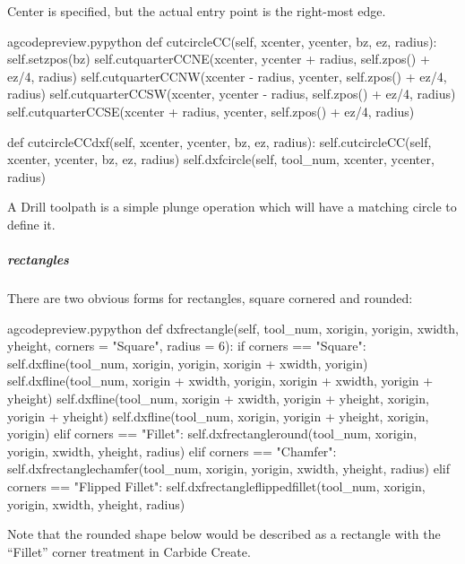 \documentclass{ltxdoc}
\begin{document}
Center is specified, but the actual entry point is the right-most edge.

\lstset{firstnumber=\thegcpy}
\begin{writecode}{a}{gcodepreview.py}{python}
    def cutcircleCC(self, xcenter, ycenter, bz, ez, radius):
        self.setzpos(bz)
        self.cutquarterCCNE(xcenter, ycenter + radius, self.zpos() + ez/4, radius) 
        self.cutquarterCCNW(xcenter - radius, ycenter, self.zpos() + ez/4, radius) 
        self.cutquarterCCSW(xcenter, ycenter - radius, self.zpos() + ez/4, radius) 
        self.cutquarterCCSE(xcenter + radius, ycenter, self.zpos() + ez/4, radius) 

    def cutcircleCCdxf(self, xcenter, ycenter, bz, ez, radius):
        self.cutcircleCC(self, xcenter, ycenter, bz, ez, radius)
        self.dxfcircle(self, tool_num, xcenter, ycenter, radius)

\end{writecode}
\addtocounter{gcpy}{49}



A Drill toolpath is a simple plunge operation which will have a matching circle to define it.

\subparagraph{rectangles}

There are two obvious forms for rectangles, square cornered and rounded:

\lstset{firstnumber=\thegcpy}
\begin{writecode}{a}{gcodepreview.py}{python}
    def dxfrectangle(self, tool_num, xorigin, yorigin, xwidth, yheight, corners = "Square", radius = 6):
        if corners == "Square":
            self.dxfline(tool_num, xorigin, yorigin, xorigin + xwidth, yorigin)
            self.dxfline(tool_num, xorigin + xwidth, yorigin, xorigin + xwidth, yorigin + yheight)
            self.dxfline(tool_num, xorigin + xwidth, yorigin + yheight, xorigin, yorigin + yheight)
            self.dxfline(tool_num, xorigin, yorigin + yheight, xorigin, yorigin)
        elif corners == "Fillet":
            self.dxfrectangleround(tool_num, xorigin, yorigin, xwidth, yheight, radius)
        elif corners == "Chamfer":
            self.dxfrectanglechamfer(tool_num, xorigin, yorigin, xwidth, yheight, radius)
        elif corners == "Flipped Fillet":
            self.dxfrectangleflippedfillet(tool_num, xorigin, yorigin, xwidth, yheight, radius)

\end{writecode}
\addtocounter{gcpy}{13}

Note that the rounded shape below would be described as a rectangle with the ``Fillet'' corner treatment in Carbide Create.
\end{document}

